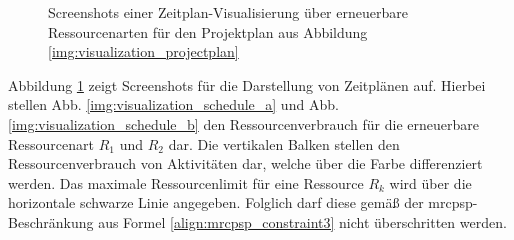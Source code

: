 \begin{figure}[H]
    \centering
  
    \caption{Screenshots einer Zeitplan-Visualisierung über erneuerbare Ressourcenarten für den Projektplan aus Abbildung \ref{img:visualization_projectplan}} 
    \label{img:visualization_schedule}
\end{figure}
Abbildung \ref{img:visualization_schedule} zeigt Screenshots für die Darstellung von Zeitplänen auf. Hierbei stellen Abb. \ref{img:visualization_schedule_a} und  Abb. \ref{img:visualization_schedule_b} den Ressourcenverbrauch für die erneuerbare Ressourcenart $R_1$ und $R_2$ dar. Die vertikalen Balken stellen den Ressourcenverbrauch von Aktivitäten dar, welche über die Farbe differenziert werden. Das maximale Ressourcenlimit für eine Ressource $R_k$ wird über die horizontale schwarze Linie angegeben. Folglich darf diese gemäß der \ac{mrcpsp}-Beschränkung aus Formel \ref{align:mrcpsp_constraint3} nicht überschritten werden. \\

